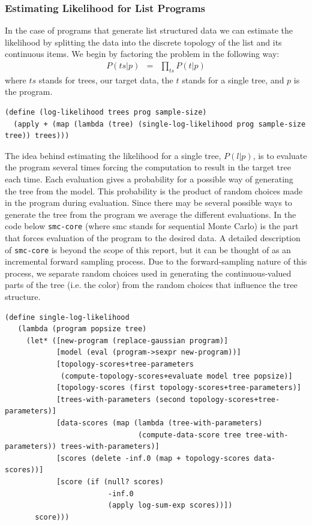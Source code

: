 \documentclass[a4paper,10pt]{article}
\begin{document}
\subsubsection{Estimating Likelihood for List Programs}
In the case of programs that generate list structured data we can estimate the likelihood by splitting the data into the discrete topology of the list and its continuous items.  We begin by factoring the problem in the following way:
\begin{eqnarray}
P(ts|p) &=& \prod_{ts}P(t|p)
\end{eqnarray}
where $ts$ stands for trees, our target data, the $t$ stands for a single tree, and $p$ is the program.
\begin{lstlisting}[frame=trBL]
(define (log-likelihood trees prog sample-size)
  (apply + (map (lambda (tree) (single-log-likelihood prog sample-size tree)) trees)))
\end{lstlisting}
The idea behind estimating the likelihood for a single tree, $P(l|p)$, is to evaluate the program several times forcing the computation to result in the target tree each time.  Each evaluation gives a probability for a possible way of generating the tree from the model.  This probability is the product of random choices made in the program during evaluation.  Since there may be several possible ways to generate the tree from the program we average the different evaluations.  In the code below \texttt{smc-core} (where smc stands for sequential Monte Carlo) is the part that forces evaluation of the program to the desired data.  A detailed description of \texttt{smc-core} is beyond the scope of this report, but it can be thought of as an incremental forward sampling process.  Due to the forward-sampling nature of this process, we separate random choices used in generating the continuous-valued parts of the tree (i.e. the color) from the random choices that influence the tree structure.
\begin{lstlisting}[frame=trBL]
(define single-log-likelihood 
   (lambda (program popsize tree)
     (let* ([new-program (replace-gaussian program)]
            [model (eval (program->sexpr new-program))]
            [topology-scores+tree-parameters 
             (compute-topology-scores+evaluate model tree popsize)]
            [topology-scores (first topology-scores+tree-parameters)]
            [trees-with-parameters (second topology-scores+tree-parameters)]
            [data-scores (map (lambda (tree-with-parameters) 
                               (compute-data-score tree tree-with-parameters)) trees-with-parameters)]
            [scores (delete -inf.0 (map + topology-scores data-scores))]
            [score (if (null? scores)
                        -inf.0
                        (apply log-sum-exp scores))])
       score)))
\end{lstlisting}
\end{document}
